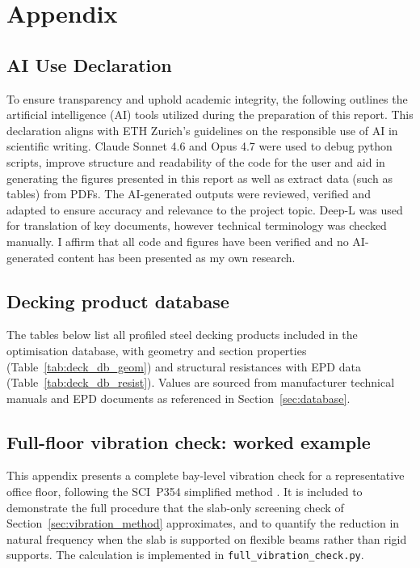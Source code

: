 \appendix
\section{Appendix}
\label{appendix}
\subsection{AI Use Declaration}
To ensure transparency and uphold academic integrity, the following outlines the artificial intelligence (AI) tools utilized during the preparation of this report. This declaration aligns with ETH Zurich's guidelines on the responsible use of AI in scientific writing. Claude Sonnet 4.6 and Opus 4.7 were used to debug python scripts, improve structure and readability of the code for the user and aid in generating the figures presented in this report as well as extract data (such as tables) from PDFs. The AI-generated outputs were reviewed, verified and adapted to ensure accuracy and relevance to the project topic. Deep-L was used for translation of key documents, however technical terminology was checked manually. I affirm that all code and figures have been verified and no AI-generated content has been presented as my own research.

\subsection{Decking product database}
\label{app:decking_db}
The tables below list all profiled steel decking products included in the optimisation database, with geometry and section properties (Table~\ref{tab:deck_db_geom}) and structural resistances with EPD data (Table~\ref{tab:deck_db_resist}). Values are sourced from manufacturer technical manuals and EPD documents as referenced in Section~\ref{sec:database}.



\subsection{Full-floor vibration check: worked example}
\label{app:vibration}
This appendix presents a complete bay-level vibration check for a representative office floor, following the SCI~P354 simplified method \citep{RefWorks:hicks2009p354}. It is included to demonstrate the full procedure that the slab-only screening check of Section~\ref{sec:vibration_method} approximates, and to quantify the reduction in natural frequency when the slab is supported on flexible beams rather than rigid supports. The calculation is implemented in \texttt{full\_vibration\_check.py}.

